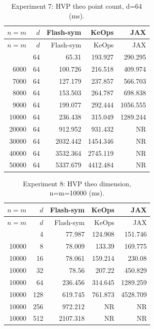 \documentclass[11pt,a4paper]{article}
\newcommand{\NR}{\textnormal{NR}}
\begin{document}
\begingroup\small
\begin{longtable}{@{}rrrrr@{}}
\caption{Experiment 7: HVP theo point count, d=64 (ms).}\label{tab:hvp-n}\\
\toprule
$n=m$ & $d$ & Flash-sym & KeOps & JAX \\
\midrule
\endfirsthead
\toprule
$n=m$ & $d$ & Flash-sym & KeOps & JAX \\
\midrule
\endhead
\bottomrule
\endfoot
5000 & 64 & 65.31 & 193.927 & 290.295 \\
6000 & 64 & 100.726 & 216.518 & 409.974 \\
7000 & 64 & 127.179 & 237.857 & 566.703 \\
8000 & 64 & 153.503 & 264.787 & 698.838 \\
9000 & 64 & 199.077 & 292.444 & 1056.555 \\
10000 & 64 & 236.438 & 315.049 & 1289.244 \\
20000 & 64 & 912.952 & 931.432 & \NR \\
30000 & 64 & 2032.442 & 1454.346 & \NR \\
40000 & 64 & 3532.364 & 2745.119 & \NR \\
50000 & 64 & 5337.679 & 4412.484 & \NR \\
\end{longtable}
\endgroup

\begingroup\small
\begin{longtable}{@{}rrrrr@{}}
\caption{Experiment 8: HVP theo dimension, n=m=10000 (ms).}\label{tab:hvp-d}\\
\toprule
$n=m$ & $d$ & Flash-sym & KeOps & JAX \\
\midrule
\endfirsthead
\toprule
$n=m$ & $d$ & Flash-sym & KeOps & JAX \\
\midrule
\endhead
\bottomrule
\endfoot
10000 & 4 & 77.987 & 124.908 & 151.746 \\
10000 & 8 & 78.009 & 133.39 & 169.775 \\
10000 & 16 & 78.061 & 159.214 & 230.08 \\
10000 & 32 & 78.56 & 207.22 & 450.829 \\
10000 & 64 & 236.456 & 314.645 & 1289.259 \\
10000 & 128 & 619.745 & 761.873 & 4528.709 \\
10000 & 256 & 972.212 & \NR & \NR \\
10000 & 512 & 2107.318 & \NR & \NR \\
\end{longtable}
\endgroup
\end{document}
